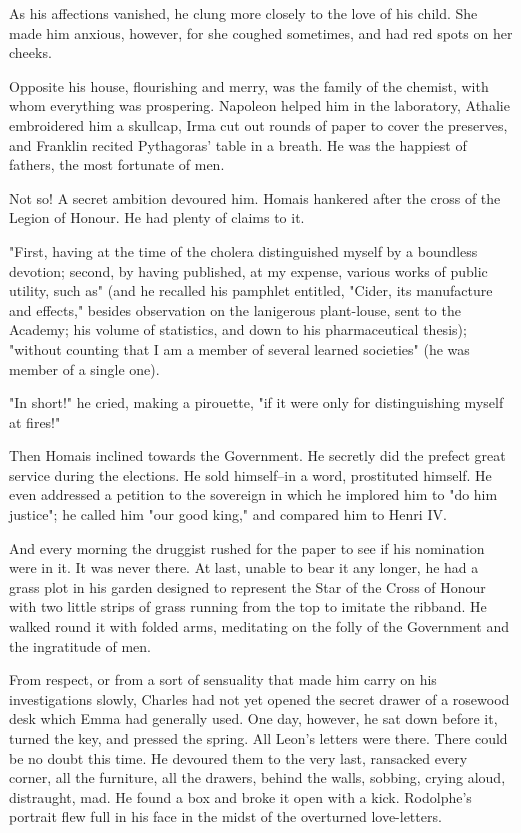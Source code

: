 \documentclass{tufte-book}
\begin{document}
As his affections vanished, he clung more closely to the love of his
child. She made him anxious, however, for she coughed sometimes, and had
red spots on her cheeks.

Opposite his house, flourishing and merry, was the family of the
chemist, with whom everything was prospering. Napoleon helped him in the
laboratory, Athalie embroidered him a skullcap, Irma cut out rounds of
paper to cover the preserves, and Franklin recited Pythagoras' table in
a breath. He was the happiest of fathers, the most fortunate of men.

Not so! A secret ambition devoured him. Homais hankered after the cross
of the Legion of Honour. He had plenty of claims to it.

"First, having at the time of the cholera distinguished myself by a
boundless devotion; second, by having published, at my expense,
various works of public utility, such as" (and he recalled his pamphlet
entitled, "Cider, its manufacture and effects," besides observation
on the lanigerous plant-louse, sent to the Academy; his volume of
statistics, and down to his pharmaceutical thesis); "without counting
that I am a member of several learned societies" (he was member of a
single one).

"In short!" he cried, making a pirouette, "if it were only for
distinguishing myself at fires!"

Then Homais inclined towards the Government. He secretly did the
prefect great service during the elections. He sold himself--in a word,
prostituted himself. He even addressed a petition to the sovereign
in which he implored him to "do him justice"; he called him "our good
king," and compared him to Henri IV.

And every morning the druggist rushed for the paper to see if his
nomination were in it. It was never there. At last, unable to bear it
any longer, he had a grass plot in his garden designed to represent the
Star of the Cross of Honour with two little strips of grass running from
the top to imitate the ribband. He walked round it with folded arms,
meditating on the folly of the Government and the ingratitude of men.

From respect, or from a sort of sensuality that made him carry on his
investigations slowly, Charles had not yet opened the secret drawer of
a rosewood desk which Emma had generally used. One day, however, he
sat down before it, turned the key, and pressed the spring. All Leon's
letters were there. There could be no doubt this time. He devoured them
to the very last, ransacked every corner, all the furniture, all the
drawers, behind the walls, sobbing, crying aloud, distraught, mad. He
found a box and broke it open with a kick. Rodolphe's portrait flew full
in his face in the midst of the overturned love-letters.
\end{document}
